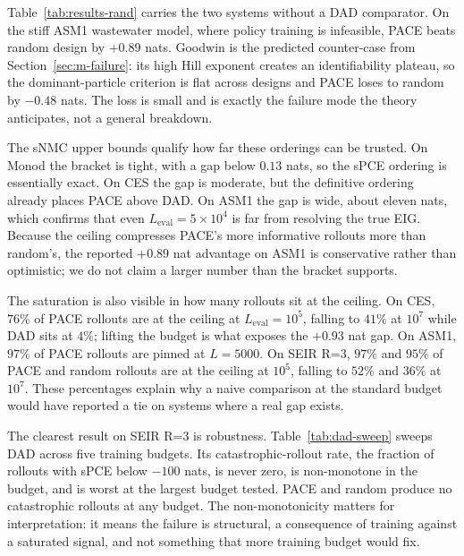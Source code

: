 Table~\ref{tab:results-rand} carries the two systems without a DAD comparator. On the
stiff ASM1 wastewater model, where policy training is infeasible, PACE beats random
design by $+0.89$ nats. Goodwin is the predicted counter-case from
Section~\ref{sec:m-failure}: its high Hill exponent creates an identifiability
plateau, so the dominant-particle criterion is flat across designs and PACE loses to
random by $-0.48$ nats. The loss is small and is exactly the failure mode the theory
anticipates, not a general breakdown.

The sNMC upper bounds qualify how far these orderings can be trusted. On Monod the
bracket is tight, with a gap below $0.13$ nats, so the sPCE ordering is essentially
exact. On CES the gap is moderate, but the definitive ordering already places PACE
above DAD. On ASM1 the gap is wide, about eleven nats, which confirms that even
$L_{\mathrm{eval}}=5\times10^4$ is far from resolving the true EIG. Because the ceiling
compresses PACE's more informative rollouts more than random's, the reported $+0.89$
nat advantage on ASM1 is conservative rather than optimistic; we do not claim a larger
number than the bracket supports.

The saturation is also visible in how many rollouts sit at the ceiling. On CES, $76\%$
of PACE rollouts are at the ceiling at $L_{\mathrm{eval}}=10^5$, falling to $41\%$ at
$10^7$ while DAD sits at $4\%$; lifting the budget is what exposes the $+0.93$ nat gap.
On ASM1, $97\%$ of PACE rollouts are pinned at $L=5000$. On SEIR R=3, $97\%$ and $95\%$
of PACE and random rollouts are at the ceiling at $10^5$, falling to $52\%$ and $36\%$
at $10^7$. These percentages explain why a naive comparison at the standard budget
would have reported a tie on systems where a real gap exists.

The clearest result on SEIR R=3 is robustness. Table~\ref{tab:dad-sweep} sweeps DAD
across five training budgets. Its catastrophic-rollout rate, the fraction of rollouts
with sPCE below $-100$ nats, is never zero, is non-monotone in the budget, and is
worst at the largest budget tested. PACE and random produce no catastrophic rollouts
at any budget. The non-monotonicity matters for interpretation: it means the failure
is structural, a consequence of training against a saturated signal, and not something
that more training budget would fix.

